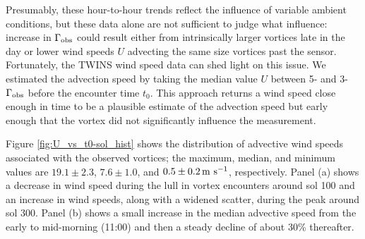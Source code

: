 \documentclass[linenumbers,trackchanges]{aastex63}
\begin{document}
Presumably, these  hour-to-hour trends reflect the influence of variable ambient conditions, but these data alone are not sufficient to judge what influence:  increase in $\Gamma_{\rm obs}$ could result either from intrinsically larger vortices late in the day or lower wind speeds $U$ advecting the same size vortices past the sensor. Fortunately, the TWINS wind speed data can shed light on this issue. We estimated the advection speed by taking the median value $U$ between 5- and 3-$\Gamma_{\rm obs}$ before the encounter time $t_0$. This approach returns a wind speed close enough in time to be a plausible estimate of the advection speed but early enough that the vortex did not significantly influence the measurement. 

Figure \ref{fig:U_vs_t0-sol_hist} shows the distribution of advective wind speeds associated with the observed vortices; the maximum, median, and minimum values are $19.1\pm2.3$, $7.6\pm1.0$, and $0.5\pm0.2 \,{\rm m\ s^{-1}}$, respectively. Panel (a) shows a  decrease in wind speed during the lull in vortex encounters around sol 100 and an increase in wind speeds, along with a widened scatter, during the peak around sol 300. Panel (b) shows a small increase in the median advective speed from the early to mid-morning (11:00) and then a steady decline of about 30\% thereafter.  
\end{document}
